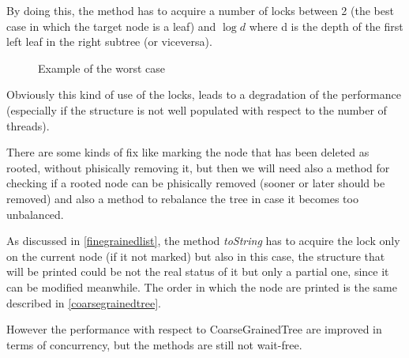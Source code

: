 By doing this, the method has to acquire a number of locks between 2 (the best case in which the target node is a leaf) and $\log d$ where d is the depth of the first left leaf in the right subtree (or viceversa).

\begin{figure}
	\centering
	\caption{Example of the worst case}
	\label{fig:badTree}
\end{figure}

Obviously this kind of use of the locks, leads to a degradation of the performance (especially if the structure is not well populated with respect to the number of threads).
\newline

There are some kinds of fix like marking the node that has been deleted as rooted, without phisically removing it, but then we will need also a method for checking if a rooted node can be phisically removed (sooner or later should be removed) and also a method to rebalance the tree in case it becomes too unbalanced.

As discussed in \ref{finegrainedlist}, the method \emph{toString} has to acquire the lock only on the current node (if it not marked) but also in this case, the structure that will be printed could be not the real status of it but only a partial one, since it can be modified meanwhile.
The order in which the node are printed is the same described in \ref{coarsegrainedtree}.
\newline

However the performance with respect to CoarseGrainedTree are improved in terms of concurrency, but the methods are still not wait-free.